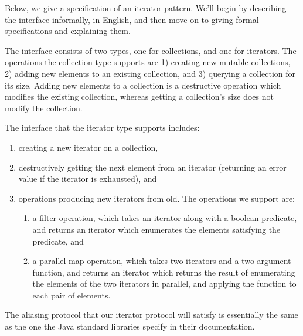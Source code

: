Below, we give a specification of an iterator pattern. We'll begin 
by describing the interface informally, in English, and then move on 
to giving formal specifications and explaining them. 

The interface consists of two types, one for collections, and one for
iterators. The operations the collection type supports are 1) creating
new mutable collections, 2) adding new elements to an existing
collection, and 3) querying a collection for its size. Adding new
elements to a collection is a destructive operation which modifies the
existing collection, whereas getting a collection's size does not
modify the collection.

The interface that the iterator type supports includes:
\begin{enumerate}
\item creating a new iterator on a collection,
\item destructively getting the next element from an iterator
  (returning an error value if the iterator is exhausted), and
\item operations producing new iterators from old. The 
  operations we support are:
  \begin{enumerate}
  \item a filter operation, which takes an iterator along with a
    boolean predicate, and returns an iterator which enumerates the
    elements satisfying the predicate, and
  \item a parallel map operation, which takes two iterators and a
    two-argument function, and returns an iterator which returns the
    result of enumerating the elements of the two iterators in
    parallel, and applying the function to each pair of elements.
  \end{enumerate}
\end{enumerate}

The aliasing protocol that our iterator protocol will satisfy is
essentially the same as the one the Java standard libraries specify in
their documentation.

